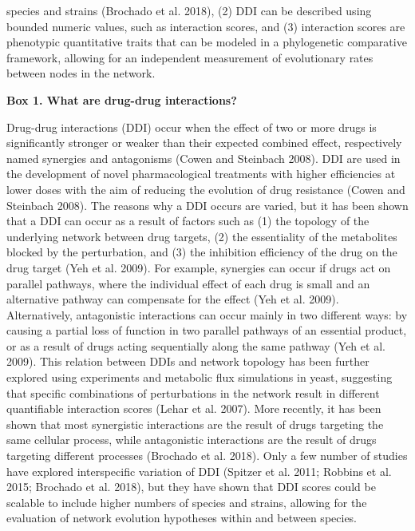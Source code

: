 \documentclass[]{elsarticle} %
\begin{document}
species and strains (Brochado et al. 2018), (2) DDI can be described using bounded numeric values, such as interaction scores, and (3) interaction scores are phenotypic quantitative traits that can be modeled in a phylogenetic comparative framework, allowing for an independent measurement of evolutionary rates between nodes in the network.

\textbf{Box 1. What are drug-drug interactions?}

Drug-drug interactions (DDI) occur when the effect of two or more drugs is significantly stronger or weaker than their expected combined effect, respectively named synergies and antagonisms (Cowen and Steinbach 2008). DDI are used in the development of novel pharmacological treatments with higher efficiencies at lower doses with the aim of reducing the evolution of drug resistance (Cowen and Steinbach 2008). The reasons why a DDI occurs are varied, but it has been shown that a DDI can occur as a result of factors such as (1) the topology of the underlying network between drug targets, (2) the essentiality of the metabolites blocked by the perturbation, and (3) the inhibition efficiency of the drug on the drug target (Yeh et al. 2009). For example, synergies can occur if drugs act on parallel pathways, where the individual effect of each drug is small and an alternative pathway can compensate for the effect (Yeh et al. 2009). Alternatively, antagonistic interactions can occur mainly in two different ways: by causing a partial loss of function in two parallel pathways of an essential product, or as a result of drugs acting sequentially along the same pathway (Yeh et al. 2009). This relation between DDIs and network topology has been further explored using experiments and metabolic flux simulations in yeast, suggesting that specific combinations of perturbations in the network result in different quantifiable interaction scores (Lehar et al. 2007). More recently, it has been shown that most synergistic interactions are the result of drugs targeting the same cellular process, while antagonistic interactions are the result of drugs targeting different processes (Brochado et al. 2018). Only a few number of studies have explored interspecific variation of DDI (Spitzer et al. 2011; Robbins et al. 2015; Brochado et al. 2018), but they have shown that DDI scores could be scalable to include higher numbers of species and strains, allowing for the evaluation of network evolution hypotheses within and between species.
\end{document}
